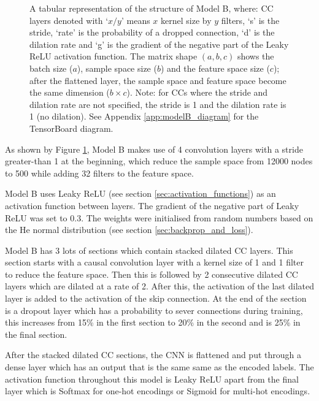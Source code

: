 \documentclass[12pt]{article}
\begin{document}
\begin{figure}[H]
\begin{scriptsize}
\begin{tabular}{l|l|l|l|l|l|l|l|l|}
                \bottomrule
            \end{tabular}
        \end{scriptsize}
        \caption{\footnotesize{A tabular representation of the structure of Model B, where: CC layers denoted with `$x/y$' means $x$ kernel size by $y$ filters, `s' is the stride, `rate' is the probability of a dropped connection, `d' is the dilation rate and `g' is the gradient of the negative part of the Leaky ReLU activation function. The matrix shape $(a, b, c)$ shows the batch size ($a$), sample space size ($b$) and the feature space size ($c$); after the flattened layer, the sample space and feature space become the same dimension ($b\times c$). Note: for CCs where the stride and dilation rate are not specified, the stride is 1 and the dilation rate is 1 (no dilation). See Appendix \ref{app:modelB_diagram} for the TensorBoard diagram.}}
        \label{fig:modelB_structure}
    \end{figure}
    
    As shown by Figure \ref{fig:modelB_structure}, Model B makes use of 4 convolution layers with a stride greater-than 1 at the beginning, which reduce the sample space from 12000 nodes to 500 while adding 32 filters to the feature space.\medskip
    
    Model B uses Leaky ReLU (see section \ref{sec:activation_functions}) as an activation function between layers. The gradient of the negative part of Leaky ReLU was set to 0.3. The weights were initialised from random numbers based on the He normal distribution (see section \ref{sec:backprop_and_loss}).\medskip
    
    Model B has 3 lots of sections which contain stacked dilated CC layers. This section starts with a causal convolution layer with a kernel size of 1 and 1 filter to reduce the feature space. Then this is followed by 2 consecutive dilated CC layers which are dilated at a rate of 2. After this, the activation of the last dilated layer is added to the activation of the skip connection. At the end of the section is a dropout layer which has a probability to sever connections during training, this increases from 15\% in the first section to 20\% in the second and is 25\% in the final section.\medskip
    
    After the stacked dilated CC sections, the CNN is flattened and put through a dense layer which has an output that is the same same as the encoded labels. The activation function throughout this model is Leaky ReLU apart from the final layer which is Softmax for one-hot encodings or Sigmoid for multi-hot encodings.\medskip
    
\end{document}
